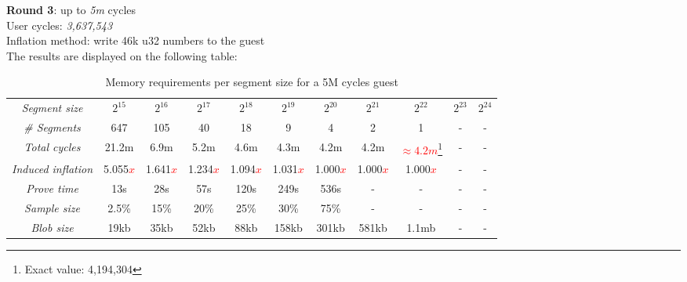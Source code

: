 \documentclass[a4paper, 10pt]{article}
\begin{document}
\par \noindent
\textbf{Round 3}: up to \textit{5m} cycles\\
User cycles: \textit{3,637,543}\\
Inflation method: write 46k u32 numbers to the guest\\
The results are displayed on the following table:
\begin{table}[H]
  	\begin{center}
    \label{tab:table4}
    \begin{minipage}{\textwidth}
    \begin{adjustbox}{width=\textwidth}
    \begin{tabular}{c|c|c|c|c|c|c|c|c|c|c}
	  \textit{Segment size} & $2^{15}$ & $2^{16}$ & $2^{17}$ & $2^{18}$ & $2^{19}$ & $2^{20}$ & $2^{21}$ & $2^{22}$ & $2^{23}$ & $2^{24}$\\
	  \textit{\# Segments} & 647 & 105 & 40 & 18 & 9 & 4 & 2 & 1 & - & -\\
	  \textit{Total cycles} & 21.2m & 6.9m & 5.2m & 4.6m & 4.3m & 4.2m & 4.2m & \textcolor{red}{$\approx 4.2m$}\footnote{Exact value: 4,194,304} & - & -\\
	  \textit{Induced inflation} & 5.055\textcolor{red}{$x$} & 1.641\textcolor{red}{$x$} & 1.234\textcolor{red}{$x$} & 1.094\textcolor{red}{$x$} & 1.031\textcolor{red}{$x$} & 1.000\textcolor{red}{$x$} & 1.000\textcolor{red}{$x$} & 1.000\textcolor{red}{$x$} & - & -\\
	  \textit{Prove time} & 13s & 28s & 57s & 120s & 249s & 536s & - & - & - & -\\
	  \textit{Sample size} & 2.5\% & 15\% & 20\% & 25\% & 30\% & 75\% & - & - & - & -\\
	  \textit{Blob size} & 19kb & 35kb & 52kb & 88kb &158kb & 301kb & 581kb & 1.1mb & - & -\\
   	\end{tabular}
   	\end{adjustbox}
   	\end{minipage}
    \caption{Memory requirements per segment size for a 5M cycles guest}
  \end{center}
\end{table}
\end{document}
